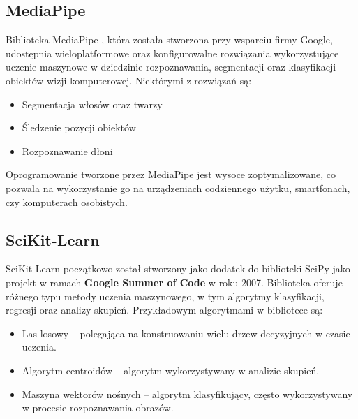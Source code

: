 \subsection{MediaPipe}

\quad Biblioteka MediaPipe \cite{bib:mediapipe} \cite{bib:mediapipe_1}, która została stworzona przy wsparciu firmy Google, udostępnia wieloplatformowe oraz konfigurowalne rozwiązania wykorzystujące uczenie maszynowe w dziedzinie rozpoznawania, segmentacji oraz klasyfikacji obiektów wizji komputerowej. Niektórymi z rozwiązań są:

\begin{itemize}
    \item Segmentacja włosów oraz twarzy
    \item Śledzenie pozycji obiektów
    \item Rozpoznawanie dłoni
\end{itemize}

\quad Oprogramowanie tworzone przez MediaPipe jest wysoce zoptymalizowane, co pozwala na wykorzystanie go na urządzeniach codziennego użytku, smartfonach, czy komputerach osobistych. 


\subsection{SciKit-Learn}

\quad SciKit-Learn \cite{bib:scikit} \cite{bib:scikit_basics} początkowo został stworzony jako dodatek do biblioteki SciPy jako projekt w ramach \textbf{Google Summer of Code} w roku 2007. Biblioteka oferuje różnego typu metody uczenia maszynowego, w tym algorytmy klasyfikacji, regresji oraz analizy skupień. Przykładowym algorytmami w bibliotece są:
\begin{itemize}
    \item Las losowy -- polegająca na konstruowaniu wielu drzew decyzyjnych w czasie uczenia. 
    \item Algorytm centroidów -- algorytm wykorzystywany w analizie skupień.
    \item Maszyna wektorów nośnych -- algorytm klasyfikujący, często wykorzystywany w procesie rozpoznawania obrazów. 
\end{itemize}